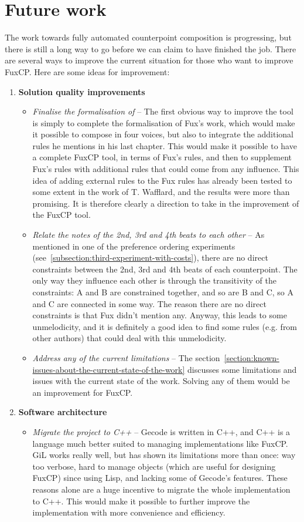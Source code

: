 \section{Future work}
The work towards fully automated counterpoint composition is progressing, but there is still a long way to go before we can claim to have finished the job. There are several ways to improve the current situation for those who want to improve FuxCP. Here are some ideas for improvement:
\begin{enumerate}
  \item \textbf{Solution quality improvements}
  \begin{itemize}
    \item \textit{Finalise the formalisation of \gap} -- The first obvious way to improve the tool is simply to complete the formalisation of Fux's work, which would make it possible to compose in four voices, but also to integrate the additional rules he mentions in his last chapter. This would make it possible to have a complete FuxCP tool, in terms of Fux's rules, and then to supplement Fux's rules with additional rules that could come from any influence. This idea of adding external rules to the Fux rules has already been tested to some extent in the work of T. Wafflard, and the results were more than promising. It is therefore clearly a direction to take in the improvement of the FuxCP tool.
    \item \textit{Relate the notes of the 2nd, 3rd and 4th beats to each other} -- As mentioned in one of the preference ordering experiments (see~\ref{subsection:third-experiment-with-costs}), there are no direct constraints between the 2nd, 3rd and 4th beats of each counterpoint. The only way they influence each other is through the transitivity of the constraints: A and B are constrained together, and so are B and C, so A and C are connected in some way. The reason there are no direct constraints is that Fux didn't mention any. Anyway, this leads to some unmelodicity, and it is definitely a good idea to find some rules (e.g. from other authors) that could deal with this unmelodicity. 
    \item \textit{Address any of the current limitations} -- The section~\ref{section:known-issues-about-the-current-state-of-the-work} discusses some limitations and issues with the current state of the work. Solving any of them would be an improvement for FuxCP.
  \end{itemize}
  
  
  \item \textbf{Software architecture}
  \begin{itemize}
    \item \textit{Migrate the project to C++} -- Gecode is written in C++, and C++ is a language much better suited to managing implementations like FuxCP. GiL works really well, but has shown its limitations more than once: way too verbose, hard to manage objects (which are useful for designing FuxCP) since using Lisp, and lacking some of Gecode's features. These reasons alone are a huge incentive to migrate the whole implementation to C++. This would make it possible to further improve the implementation with more convenience and efficiency.
    

\end{itemize}
\end{enumerate}
